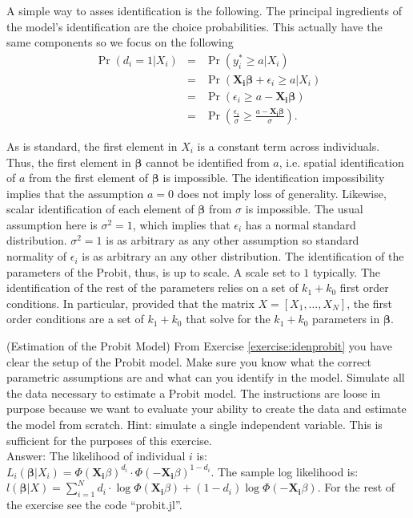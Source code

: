 \begin{exercise}
\indent A simple way to asses identification is the following. The principal ingredients of the model's identification are the choice probabilities. This actually have the same components so we focus on the following
\begin{eqnarray}
\Pr\left(d_{i} = 1 | X_{i}\right) &=& \Pr\left(y_{i}^{*} \geq a |X_{i}\right) \\ \nonumber
&=& \Pr\left(\mathbf{X_{i} \beta} + \epsilon_{i} \geq a |X_{i}\right) \\ \nonumber
&=& \Pr\left(\epsilon_{i} \geq a - \mathbf{X_{i} \beta} \right) \\ \nonumber
&=& \Pr \left( \frac{\epsilon_{i}}{\sigma} \geq \frac{a - \mathbf{X_{i} \beta}}{\sigma} \right).
\end{eqnarray}
\end{exercise}
\noindent As is standard, the first element in $X_{i}$ is a constant term across individuals. Thus, the first element in $\mathbf{\beta}$ cannot be identified from $a$, i.e. spatial identification of $a$ from the first element of $\mathbf{\beta}$ is impossible. The identification impossibility implies that the assumption $a = 0$ does not imply loss of generality. Likewise, scalar identification of each element of  $\mathbf{\beta}$ from $\sigma$ is impossible. The usual assumption here is $\sigma^2 = 1$, which implies that $\epsilon_{i}$ has a normal standard distribution. $\sigma^2 = 1$ is as arbitrary as any other assumption so standard normality of $\epsilon_{i}$ is as arbitrary an any other distribution. The identification of the parameters of the Probit, thus, is up to scale. A scale set to $1$ typically. The identification of the rest of the parameters relies on a set of $k_{1} + k_{0}$ first order conditions. In particular, provided that the matrix $X = [ X_{1}, \ldots, X_{N}]$, the first order conditions are a set of $k_{1} + k_{0}$ that solve for the $k_{1} + k_{0}$ parameters in $\mathbf{\beta}$. 

\setcounter{theorem}{2}
\begin{exercise} (Estimation of the Probit Model)
From Exercise \ref{exercise:idenprobit} you have clear the setup of the Probit model. Make sure you know what the correct parametric assumptions are and what can you identify in the model. Simulate all the data necessary to estimate a Probit model. The instructions are loose in purpose because we want to evaluate your ability to create the data and estimate the model from scratch. Hint: simulate a single independent variable. This is sufficient for the purposes of this exercise.\\
\noindent Answer:
\noindent The likelihood of individual $i$ is: $L_{i} \left( \mathbf{\beta}|X_{i} \right) = \Phi\left( \mathbf{X_{i}} \beta \right)^{d_{i}} \cdot \Phi\left( - \mathbf{X_{i}} \beta \right) ^{1 - d_{i}}  $. The sample log likelihood is: $l \left( \mathbf{\beta}|X \right) = \sum \limits _{i=1} ^{N} d_{i} \cdot  \log \Phi\left( \mathbf{X_{i}} \beta \right) + (1 - d_{i}) \log \Phi\left( - \mathbf{X_{i}} \beta \right)$. For the rest of the exercise see the code ``probit.jl''. 
\end{exercise}



